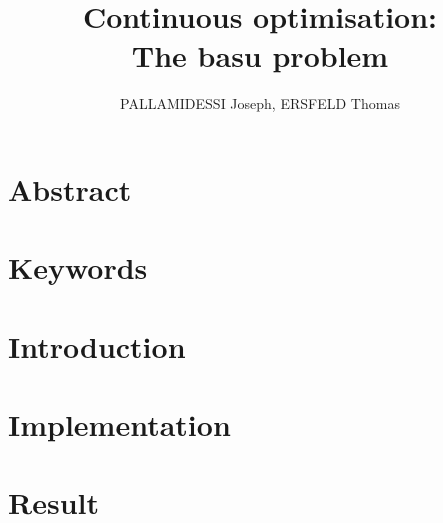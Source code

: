 \documentclass{article}
\begin{document}
  \title{Continuous optimisation: \\
    \large The basu problem}
  \author{PALLAMIDESSI Joseph, ERSFELD Thomas}
  \maketitle
  
  \section{Abstract} %
  \label{sec:Abstract}
    \paragraph{} %
    \label{par:}
    

  \section{Keywords} %
  \label{sec:Keyword}
    \paragraph{} %
    \label{par:}
    
  
  \section{Introduction} %
  \label{sec:Intr}
    \paragraph{} %
    \label{par:}
    

  \section{Implementation} %
  \label{sec:Implementation}
    \paragraph{} %
    \label{par:}
    

  \section{Result} %
  \label{sec:Result}
    \paragraph{} %
    \label{par:}
    

  
\end{document}
